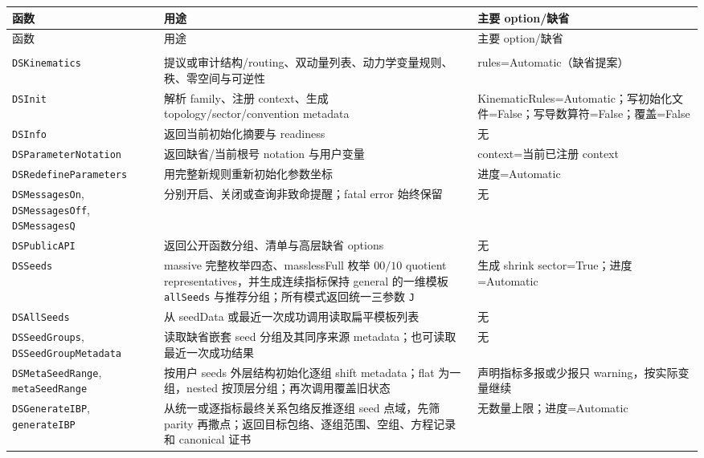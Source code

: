 ﻿\documentclass[a4paper,11pt]{article}
\begin{document}
\begingroup
\scriptsize
\renewcommand{\arraystretch}{0.98}
\begin{longtable}{@{}>{\raggedright\arraybackslash}p{}>{\raggedright\arraybackslash}p{}>{\raggedright\arraybackslash}p{}@{}}
\toprule
函数 & 用途 & 主要 option/缺省 \\
\midrule
\endfirsthead
\toprule
函数 & 用途 & 主要 option/缺省 \\
\midrule
\endhead
\midrule
\multicolumn{3}{r}{续下页} \\
\endfoot
\bottomrule
\endlastfoot
\texttt{DSKinematics} & 提议或审计结构/routing、双动量列表、动力学变量规则、秩、零空间与可逆性 & rules=Automatic（缺省提案） \\
\texttt{DSInit} & 解析 family、注册 context、生成 topology/sector/convention metadata & KinematicRules=Automatic；写初始化文件=False；写导数算符=False；覆盖=False \\
\texttt{DSInfo} & 返回当前初始化摘要与 readiness & 无 \\
\texttt{DSParameterNotation} & 返回缺省/当前根号 notation 与用户变量 & context=当前已注册 context \\
\texttt{DSRedefineParameters} & 用完整新规则重新初始化参数坐标 & 进度=Automatic \\
\texttt{DSMessagesOn}, \texttt{DSMessagesOff}, \texttt{DSMessagesQ} & 分别开启、关闭或查询非致命提醒；fatal error 始终保留 & 无 \\
\texttt{DSPublicAPI} & 返回公开函数分组、清单与高层缺省 options & 无 \\
\texttt{DSSeeds} & massive 完整枚举四态、masslessFull 枚举 $00/10$ quotient representatives，并生成连续指标保持 general 的一维模板 \texttt{allSeeds} 与推荐分组；所有模式返回统一三参数 \texttt{J} & 生成 shrink sector=True；进度=Automatic \\
\texttt{DSAllSeeds} & 从 seedData 或最近一次成功调用读取扁平模板列表 & 无 \\
\texttt{DSSeedGroups}, \texttt{DSSeedGroupMetadata} & 读取缺省嵌套 seed 分组及其同序来源 metadata；也可读取最近一次成功结果 & 无 \\
\texttt{DSMetaSeedRange}, \texttt{metaSeedRange} & 按用户 seeds 外层结构初始化逐组 shift metadata；flat 为一组，nested 按顶层分组；再次调用覆盖旧状态 & 声明指标多报或少报只 warning，按实际变量继续 \\
\texttt{DSGenerateIBP}, \texttt{generateIBP} & 从统一或逐指标最终关系包络反推逐组 seed 点域，先筛 parity 再撒点；返回目标包络、逐组范围、空组、方程记录和 canonical 证书 & 无数量上限；进度=Automatic \\

\end{longtable}
\end{document}
